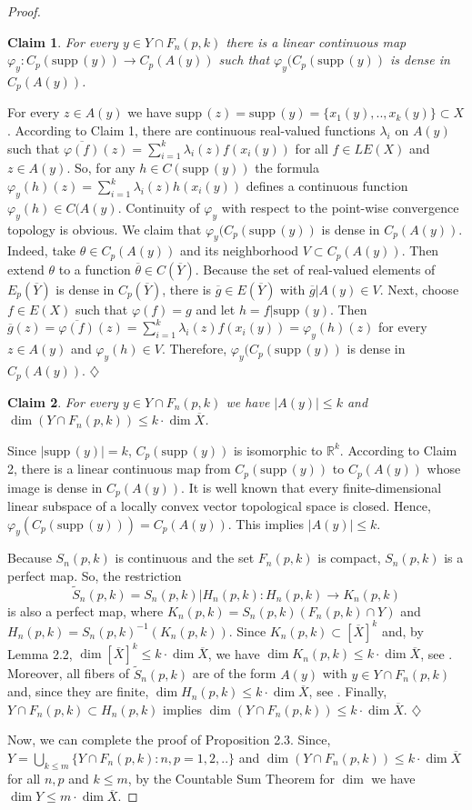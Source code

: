 \documentclass[12pt]{amsart}
\newtheorem{claim}{Claim}
\def\supp{{\mathrm {supp}}\,}
\begin{document}
\begin{proof}
\begin{claim}
For every $y\in Y\cap F_n(p,k)$ there is a linear continuous map
$\varphi_y:C_p(\supp(y))\to C_p(A(y))$ such that $\varphi_y(C_p(\supp(y))$ is dense in  $C_p(A(y))$. 
\end{claim}
For every $z\in A(y)$ we have $\supp(z)=\supp(y)=\{x_1(y),..,x_k(y)\}\subset X$.
According to Claim 1, there are continuous real-valued functions $\lambda_i$ on $A(y)$ such that $\overline{\varphi(f)}(z)=\sum_{i=1}^k\lambda_i(z)f(x_i(y))$ for all $f\in LE(X)$ and $z\in A(y)$. So, 
for any  $h\in C(\supp(y))$ the formula
$\varphi_y(h)(z)=\sum_{i=1}^k\lambda_i(z)h(x_i(y))$  defines a continuous function $\varphi_y(h)\in C(A(y)$. 
Continuity of $\varphi_y$ with respect to the point-wise convergence topology is obvious. We claim that $\varphi_y(C_p(\supp(y))$ is dense in  $C_p(A(y))$. Indeed, take $\theta\in C_p(A(y))$ and its neighborhood $V\subset C_p(A(y))$. Then extend $\theta$ to a function $\overline\theta\in C(\overline Y)$.   
Because the set of real-valued elements of $E_p(\overline Y)$ is dense in $C_p(\overline Y)$, there is $\overline g\in E(\overline Y)$ with $\overline g|A(y)\in V$. 
Next, choose $f\in E(X)$ such that $\varphi(f)=g$ and let $h=f|\supp(y)$. Then  
$\overline g(z)=\overline{\varphi(f)}(z)=\sum_{i=1}^k\lambda_i(z)f(x_i(y))=\varphi_y(h)(z)$ for every $z\in A(y)$ and $\varphi_y(h)\in V$. Therefore, 
$\varphi_y(C_p(\supp(y))$ is dense in  $C_p(A(y))$.  $\diamondsuit$

\begin{claim}
For every $y\in Y\cap F_n(p,k)$ we have $|A(y)|\leq k$ and $\dim (Y\cap F_n(p,k))\leq k\cdot\dim\overline X$. 
\end{claim}
Since $|\supp(y)|=k$, $C_p(\supp(y))$ is isomorphic to $\mathbb R^k$. According to Claim 2, there is a linear continuous map from $C_p(\supp(y))$ to $C_p(A(y))$ whose image is dense in $C_p(A(y))$. It is well known that every finite-dimensional linear subspace of a locally convex vector topological space is closed. Hence, 
$\varphi_y(C_p(\supp(y)))=C_p(A(y))$. This implies $|A(y)|\leq k$. 

Because $S_n(p,k)$ is continuous and the set $F_n(p,k)$ is compact, $S_n(p,k)$ is a perfect map. So, the restriction 
$$\widetilde S_n(p,k)=S_n(p,k)|H_n(p,k):H_n(p,k)\to K_n(p,k)$$ is also a perfect map, where $K_n(p,k)=S_n(p,k)(F_n(p,k)\cap Y)$ and
$H_n(p,k)=S_n(p,k)^{-1}(K_n(p,k))$. Since $K_n(p,k)\subset [\overline X]^k$ and, by Lemma 2.2, $\dim [\overline X]^k\leq k\cdot\dim\overline X$, we have 
$\dim K_n(p,k)\leq k\cdot\dim\overline X$, see \cite[Theorem 4.1.3 and Theorem 4.1.7,]{en}. 
Moreover, all fibers of $\widetilde S_n(p,k)$ are of the form  $A(y)$ with $y\in Y\cap F_n(p,k)$ and, since they are finite,
$\dim H_n(p,k)\leq k\cdot\dim\overline X$, see \cite[Theorem 3.3.10]{en}. Finally, $Y\cap F_n(p,k)\subset H_n(p,k)$ implies $\dim (Y\cap F_n(p,k))\leq k\cdot\dim\overline X$. $\diamondsuit$

Now, we can complete the proof of Proposition 2.3. Since, $Y=\bigcup_{k\leq m}\{Y\cap F_n(p,k):n,p=1,2,..\}$ and 
$\dim(Y\cap F_n(p,k))\leq k\cdot\dim\overline X$ for all $n,p$ and $k\leq m$,  by the Countable Sum Theorem for $\dim$ we have  $\dim Y\leq m\cdot\dim\overline X$.
\end{proof}
\end{document}

